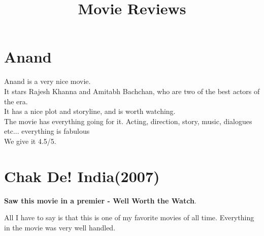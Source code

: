 \documentclass[11pt]{article}
\title{\textbf{Movie Reviews}}
\author{}
\date{}
\begin{document}
\maketitle
\section*{Anand}
Anand is a very nice movie.\\
It stars Rajesh Khanna and Amitabh Bachchan, who are two of the best actors of the era.\\
It has a nice plot and storyline, and is worth watching.\\
The movie has everything going for it. Acting, direction, story, music, dialogues etc... everything is fabulous\\
We give it 4.5/5.

\section*{Chak De! India(2007)}
\textbf{Saw this movie in a premier - Well Worth the Watch}.

All I have to say is that this is one of my favorite movies of all time. Everything in the movie was very well handled.
\end{document}
